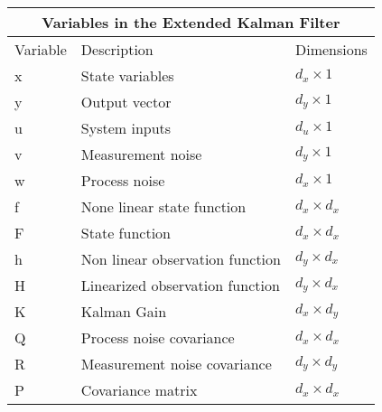 \begin{center}
    
\centering
\begin{tabular}{ |p{2cm}||p{5cm}|p{2cm}| }
    \hline
    \multicolumn{3}{|c|}{Variables in the Extended Kalman Filter } \\ 
    \hline
    Variable & Description & Dimensions \\
    \hline
   x & State variables  & $d_x \times 1$ \\
    y & Output vector  & $d_y \times 1$ \\
    u & System inputs  & $d_u \times 1$\\
    v & Measurement noise & $d_y \times 1$\\
    w & Process noise & $d_x \times 1$\\
    f & None linear state function  & $d_x \times d_x $  \\ 
    F & State function  & $d_x \times d_x $  \\ 
    h & Non linear observation function & $d_y \times d_x$\\
    H & Linearized observation function & $d_y \times d_x$\\
    K & Kalman Gain  & $d_x \times d_y$\\
    Q & Process noise covariance  & $d_x \times d_x$ \\
    R & Measurement noise covariance &  $d_y \times d_y$\\
    P & Covariance matrix & $d_x \times d_x $  \\ 
    \hline
\end{tabular}
\end{center}
